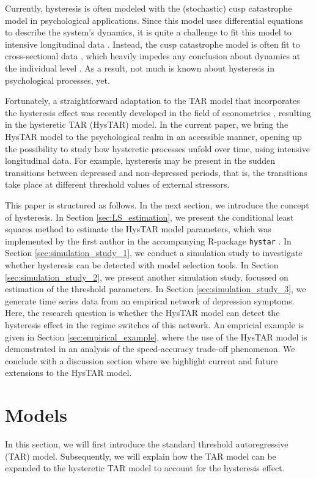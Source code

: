 \documentclass{article}
\begin{document}
Currently, hysteresis is often modeled with the (stochastic) cusp catastrophe model in psychological applications. Since this model uses differential equations to describe the system's dynamics, it is quite a challenge to fit this model to intensive longitudinal data \citep{cobb, CT_limitations1, CT_limitations2, R_cusp}. 
Instead, the cusp catastrophe model is often fit to cross-sectional data \citep[e.g.,][]{cusp_example_1, cusp_example_2, cusp_example_3}, which heavily impedes any conclusion about dynamics at the individual level \citep{molenaar_manifesto, hamaker_within}.
As a result, not much is known about hysteresis in psychological processes, yet.

Fortunately, a straightforward adaptation to the TAR model that incorporates the hysteresis effect was recently developed in the field of econometrics \citep{bar2}, resulting in the hysteretic TAR (HysTAR) model.
In the current paper, we bring the HysTAR model to the psychological realm in an accessible manner, opening up the possibility to study how hysteretic processes unfold over time, using intensive longitudinal data.
For example, hysteresis may be present in the sudden transitions between depressed and non-depressed periods, that is, the transitions take place at different threshold values of external stressors.

This paper is structured as follows.
In the next section, we introduce the concept of hysteresis.
In Section \ref{sec:LS_estimation}, we present the conditional least squares method to estimate the HysTAR model parameters, which was implemented by the first author in the accompanying \textsf{R}-package \texttt{hystar} \citep{R, R_hystar}.
In Section \ref{sec:simulation_study_1}, we conduct a simulation study to investigate whether hysteresis can be detected with model selection tools.
In Section \ref{sec:simulation_study_2}, we present another simulation study, focussed on estimation of the threshold parameters.
In Section \ref{sec:simulation_study_3}, we generate time series data from an empirical network of depression symptoms. Here, the research question is whether the HysTAR model can detect the hysteresis effect in the regime switches of this network.
An empricial example is given in Section \ref{sec:empirical_example}, where the use of the HysTAR model is demonstrated in an analysis of the speed-accuracy trade-off phenomenon.
We conclude with a discussion section where we highlight current and future extensions to the HysTAR model.

\section{Models} \label{sec:hystar}
In this section, we will first introduce the standard threshold autoregressive (TAR) model.
Subsequently, we will explain how the TAR model can be expanded to the hysteretic TAR model to account for the hysteresis effect.
\end{document}
